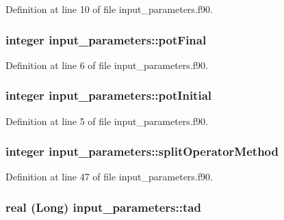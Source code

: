 Definition at line 10 of file input\_\-parameters.f90.

\hypertarget{namespaceinput__parameters_a2ccc9d711d290b3e33fbc675ed390af2}{
\subsubsection[{potFinal}]{\setlength{\rightskip}{0pt plus 5cm}integer {\bf input\_\-parameters::potFinal}}}
\label{namespaceinput__parameters_a2ccc9d711d290b3e33fbc675ed390af2}


Definition at line 6 of file input\_\-parameters.f90.

\hypertarget{namespaceinput__parameters_a27dbda031851f558814121445cf46ed9}{
\subsubsection[{potInitial}]{\setlength{\rightskip}{0pt plus 5cm}integer {\bf input\_\-parameters::potInitial}}}
\label{namespaceinput__parameters_a27dbda031851f558814121445cf46ed9}


Definition at line 5 of file input\_\-parameters.f90.

\hypertarget{namespaceinput__parameters_a127f71f45eade1f05ced1535e88c771d}{
\subsubsection[{splitOperatorMethod}]{\setlength{\rightskip}{0pt plus 5cm}integer {\bf input\_\-parameters::splitOperatorMethod}}}
\label{namespaceinput__parameters_a127f71f45eade1f05ced1535e88c771d}


Definition at line 47 of file input\_\-parameters.f90.

\hypertarget{namespaceinput__parameters_ab3ac3c45168fc6aafd02e70822154417}{
\subsubsection[{tad}]{\setlength{\rightskip}{0pt plus 5cm}real (Long) {\bf input\_\-parameters::tad}}}
\label{namespaceinput__parameters_ab3ac3c45168fc6aafd02e70822154417}


